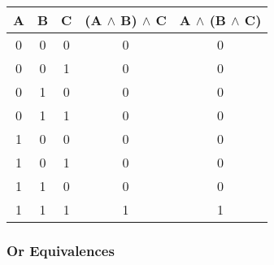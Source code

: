 \documentclass[12pt]{article}
\begin{document}
\begin{enumerate}
\begin{center}

  \begin{tabular}{| c | c | c | c | c |}

    \hline

    A & B & C & (A $\land$ B) $\land$ C & A $\land$ (B $\land$ C) \\ \hline

    0 & 0 & 0 & 0 & 0 \\

    0 & 0 & 1 & 0 & 0 \\

    0 & 1 & 0 & 0 & 0 \\

    0 & 1 & 1 & 0 & 0 \\

    1 & 0 & 0 & 0 & 0 \\

    1 & 0 & 1 & 0 & 0 \\

    1 & 1 & 0 & 0 & 0 \\

    1 & 1 & 1 & 1 & 1 \\ \hline

  \end{tabular}

\end{center}

\end{enumerate}



\subsubsection{Or Equivalences}
\end{document}
